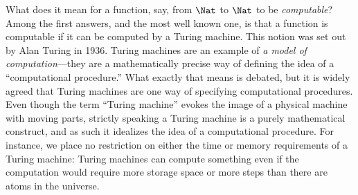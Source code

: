 \documentclass[../../../include/open-logic-section]{subfiles}
\begin{document}

What does it mean for a function, say, from $\Nat$ to $\Nat$ to be
\emph{computable}? Among the first answers, and the most well known
one, is that a function is computable if it can be computed by a
Turing machine. This notion was set out by Alan Turing in 1936.
Turing machines are an example of \emph{a model of computation}---they
are a mathematically precise way of defining the idea of a
``computational procedure.''  What exactly that means is debated, but
it is widely agreed that Turing machines are one way of specifying
computational procedures.  Even though the term ``Turing machine''
evokes the image of a physical machine with moving parts, strictly
speaking a Turing machine is a purely mathematical construct, and as
such it idealizes the idea of a computational procedure.  For
instance, we place no restriction on either the time or memory
requirements of a Turing machine: Turing machines can compute
something even if the computation would require more storage space or
more steps than there are atoms in the universe.
\end{document}
